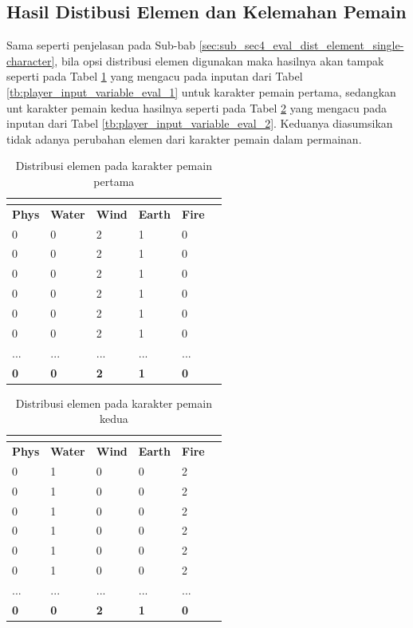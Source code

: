 \subsection{Hasil Distibusi Elemen dan Kelemahan Pemain}
\label{sec:sub_sec4_eval_dist_element_multi-character}
\vspace{1ex}

Sama seperti penjelasan pada Sub-bab \ref{sec:sub_sec4_eval_dist_element_single-character}, bila opsi distribusi elemen digunakan maka hasilnya akan tampak seperti pada Tabel \ref{tb:player_element_1} yang mengacu pada inputan dari Tabel \ref{tb:player_input_variable_eval_1} untuk karakter pemain pertama, sedangkan unt karakter pemain kedua hasilnya seperti pada Tabel \ref{tb:player_element_2} yang mengacu pada inputan dari Tabel \ref{tb:player_input_variable_eval_2}. Keduanya diasumsikan tidak adanya perubahan elemen dari karakter pemain dalam permainan.
\vspace{-1ex}

\begin{longtable}{|l|l|l|l|l|l|}
	\caption{Distribusi elemen pada karakter pemain pertama}
	\vspace{1ex}
	\label{tb:player_element_1}\\
	\hline
	\rowcolor[HTML]{C0C0C0} 
	\textbf{Phys} & \textbf{Water} & \textbf{Wind} & \textbf{Earth} & \textbf{Fire} \\ \hline
	0 & 0 & 2 & 1 & 0 \\ \hline
	0 & 0 & 2 & 1 & 0 \\ \hline
	0 & 0 & 2 & 1 & 0 \\ \hline
	0 & 0 & 2 & 1 & 0 \\ \hline
	0 & 0 & 2 & 1 & 0 \\ \hline
	0 & 0 & 2 & 1 & 0 \\ \hline
	... & ... & ... & ... & ... \\ \hline
	\textbf{0} & \textbf{0} & \textbf{2} & \textbf{1} & \textbf{0} \\ \hline
\end{longtable}
\vspace{-1ex}

\begin{longtable}{|l|l|l|l|l|l|}
	\caption{Distribusi elemen pada karakter pemain kedua}
	\vspace{1ex}
	\label{tb:player_element_2}\\
	\hline
	\rowcolor[HTML]{C0C0C0} 
	\textbf{Phys} & \textbf{Water} & \textbf{Wind} & \textbf{Earth} & \textbf{Fire} \\ \hline
	0 & 1 & 0 & 0 & 2 \\ \hline
	0 & 1 & 0 & 0 & 2 \\ \hline
	0 & 1 & 0 & 0 & 2 \\ \hline
	0 & 1 & 0 & 0 & 2 \\ \hline
	0 & 1 & 0 & 0 & 2 \\ \hline
	0 & 1 & 0 & 0 & 2 \\ \hline
	... & ... & ... & ... & ... \\ \hline
	\textbf{0} & \textbf{0} & \textbf{2} & \textbf{1} & \textbf{0} \\ \hline
\end{longtable}
\vspace{1ex}


